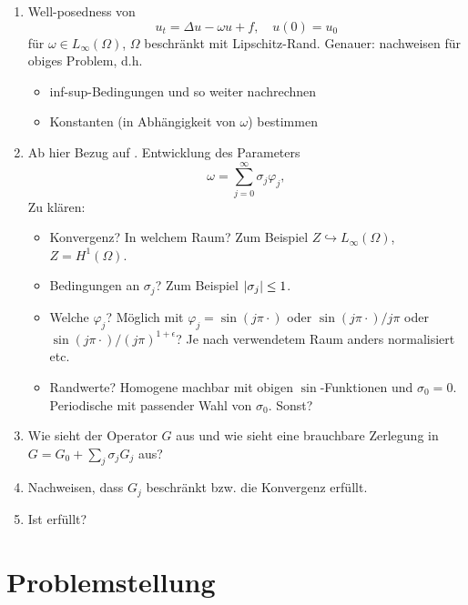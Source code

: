 \begin{enumerate}
    \item Well-posedness von
    \begin{equation}
        u_{t} = \Delta u - \omega u + f, \quad u(0) = u_{0}
    \end{equation}
    für $\omega \in L_{\infty}(\Omega)$, $\Omega$ beschränkt mit Lipschitz-Rand.
    Genauer: \cite[Theorem 5.1]{Schwab:2009ec}  nachweisen für obiges Problem, d.h.
    \begin{itemize}
        \item inf-sup-Bedingungen und so weiter nachrechnen 
        \item Konstanten (in Abhängigkeit von $\omega$) bestimmen 
    \end{itemize}
    \item {}Ab hier Bezug auf \cite{Kunoth:2013ef}.
        Entwicklung des Parameters
    \begin{equation}
        \omega = \sum_{j = 0}^{\infty} \sigma_{j} \varphi_{j},
    \end{equation}
    Zu klären:
    \begin{itemize}
        \item Konvergenz? In welchem Raum? Zum Beispiel $Z \hookrightarrow L_{\infty}(\Omega)$, $Z = H^{1}(\Omega)$.
        \item Bedingungen an $\sigma_{j}$? Zum Beispiel $\lvert\sigma_{j}\rvert \leq 1$.
        \item Welche $\varphi_{j}$? Möglich mit $\varphi_{j} = \sin(j \pi \cdot)$ oder $\sin(j \pi \cdot) / j \pi$ oder $\sin(j \pi \cdot) / (j \pi)^{1 + \epsilon}$? Je nach verwendetem Raum anders normalisiert etc.
        \item Randwerte? Homogene machbar mit obigen $\sin$-Funktionen und $\sigma_{0} = 0$. Periodische mit passender Wahl von $\sigma_{0}$. Sonst?
    \end{itemize}
    \item Wie sieht der Operator $G$ aus und wie sieht eine brauchbare Zerlegung in $G = G_{0} + \sum_{j} \sigma_{j} G_{j}$ aus?
    \item Nachweisen, dass $G_{j}$ beschränkt bzw. die Konvergenz erfüllt.
    \item Ist \cite[Assumption 2]{Kunoth:2013ef} erfüllt?
\end{enumerate}



\section{Problemstellung} %
\label{sub:problemstellung}


